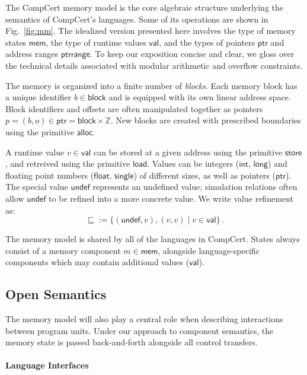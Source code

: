 \documentclass[sigplan,10pt,review,anonymous]{acmart}\settopmatter{printfolios=true,printccs=false,printacmref=false}
\newcommand{\kw}[1]{\ensuremath{ \mathsf{#1} }}
\begin{document}
The CompCert memory model \cite{compcertmm,compcertmmv2}
is the core algebraic structure
underlying the semantics of CompCert's languages.
Some of its operations
are shown in Fig.~\ref{fig:mm}.
The idealized version presented here
involves
the type of memory states \kw{mem},
the type of runtime values \kw{val}, and
the types of pointers \kw{ptr} and address ranges \kw{ptrrange}.
To keep our exposition concise and clear,
we gloss over the technical details
associated with modular arithmetic and overflow constraints.

The memory is organized into a finite number of \emph{blocks}.
Each memory block has a unique identifier $b \in \kw{block}$
and is equipped with its own linear address space.
Block identifiers and offsets are often manipulated together
as pointers $p = (b, o) \in \kw{ptr} = \kw{block} \times \mathbb{Z}$.
New blocks are created with prescribed boundaries
using the primitive $\kw{alloc}$.

A runtime value $v \in \kw{val}$ can be stored at
a given address using the primitive \kw{store},
and retreived using the primitive \kw{load}.
Values can be integers (\kw{int}, \kw{long}) and
floating point numbers (\kw{float}, \kw{single})
of different sizes,
as well as pointers (\kw{ptr}).
The special value \kw{undef}
represents an undefined value;
simulation relations
often allow $\kw{undef}$
to be refined into a more concrete value.
We write value refinement as:
\[
    {\sqsubseteq} := \{(\kw{undef}, v), (v, v) \mid v \in \kw{val}\} \,.
\]

The memory model is shared by all of the languages in CompCert.
States always consist of
a memory component $m \in \kw{mem}$,
alongside language-specific components
which may contain additional values ($\kw{val}$).


\subsection{Open Semantics} \label{sec:sem:open} %

The memory model will also play a central role
when describing interactions between program units.
Under our approach to component semantics,
the memory state is passed back-and-forth
alongside all control transfers.

\paragraph{Language Interfaces} %
\end{document}
